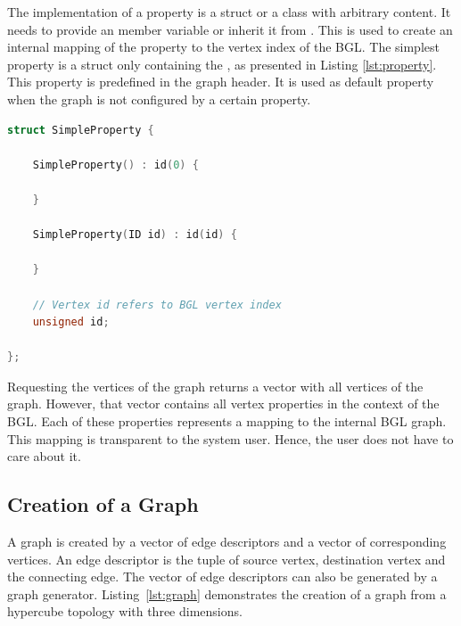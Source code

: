 The implementation of a property is a struct or a class with arbitrary
content. It needs to provide an  member variable or inherit
it from . This  is used to create an internal
mapping of the property to the vertex index of the BGL.  The 
simplest property is a struct only containing the , as
presented in Listing \ref{lst:property}. This property is predefined
in the graph header. It is used as default property when the graph is not
configured by a certain property.

\begin{minipage}[t]{\textwidth} 
\begin{lstlisting}[language=C++, label=lst:property, caption={Predefined property within the graph class which only provides an id member variable. This property can be used a skeleton for further property implementations. }]
struct SimpleProperty {

    SimpleProperty() : id(0) {

    }
    
    SimpleProperty(ID id) : id(id) {

    }

    // Vertex id refers to BGL vertex index
    unsigned id;
    
};
\end{lstlisting}
\end{minipage}

\noindent Requesting the vertices of the graph returns a vector with
all vertices of the graph. However, that vector contains all vertex
properties in the context of the BGL. Each of these properties
represents a mapping to the internal BGL graph. This mapping is
transparent to the system user. Hence, the user does not have to care
about it.

\subsection{Creation of a Graph}
A graph is created by a vector of edge descriptors and a vector of
corresponding vertices. An edge descriptor is the tuple of source
vertex, destination vertex and the connecting edge. The vector of edge
descriptors can also be generated by a graph
generator. Listing~\ref{lst:graph} demonstrates the creation of a graph from
a hypercube topology with three dimensions.

